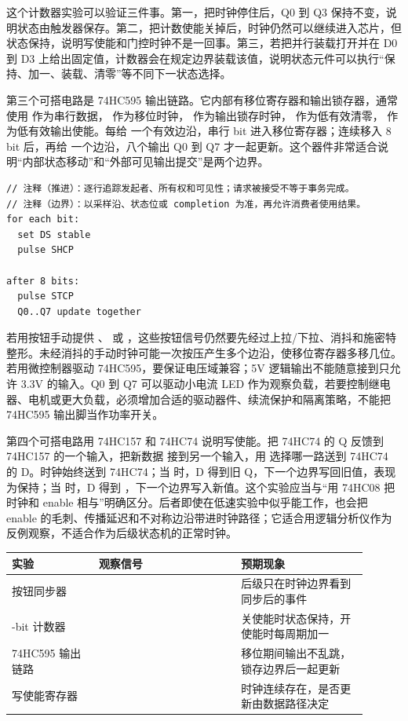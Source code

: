 这个计数器实验可以验证三件事。第一，把时钟停住后，Q0 到 Q3 保持不变，说明状态由触发器保存。第二，把计数使能关掉后，时钟仍然可以继续进入芯片，但状态保持，说明写使能和门控时钟不是一回事。第三，若把并行装载打开并在 D0 到 D3 上给出固定值，计数器会在规定边界装载该值，说明状态元件可以执行“保持、加一、装载、清零”等不同下一状态选择。

第三个可搭电路是 74HC595 输出链路。它内部有移位寄存器和输出锁存器，通常使用  作为串行数据， 作为移位时钟， 作为输出锁存时钟， 作为低有效清零， 作为低有效输出使能。每给  一个有效边沿，串行 bit 进入移位寄存器；连续移入 8 bit 后，再给  一个边沿，八个输出 Q0 到 Q7 才一起更新。这个器件非常适合说明“内部状态移动”和“外部可见输出提交”是两个边界。

\begin{lstlisting}
// 注释（推进）：逐行追踪发起者、所有权和可见性；请求被接受不等于事务完成。
// 注释（边界）：以采样沿、状态位或 completion 为准，再允许消费者使用结果。
for each bit:
  set DS stable
  pulse SHCP

after 8 bits:
  pulse STCP
  Q0..Q7 update together
\end{lstlisting}

若用按钮手动提供 、 或 ，这些按钮信号仍然要先经过上拉/下拉、消抖和施密特整形。未经消抖的手动时钟可能一次按压产生多个边沿，使移位寄存器多移几位。若用微控制器驱动 74HC595，要保证电压域兼容；5V 逻辑输出不能随意接到只允许 3.3V 的输入。Q0 到 Q7 可以驱动小电流 LED 作为观察负载，若要控制继电器、电机或更大负载，必须增加合适的驱动器件、续流保护和隔离策略，不能把 74HC595 输出脚当作功率开关。

第四个可搭电路用 74HC157 和 74HC74 说明写使能。把 74HC74 的 Q 反馈到 74HC157 的一个输入，把新数据  接到另一个输入，用  选择哪一路送到 74HC74 的 D。时钟始终送到 74HC74；当  时，D 得到旧 Q，下一个边界写回旧值，表现为保持；当  时，D 得到 ，下一个边界写入新值。这个实验应当与“用 74HC08 把时钟和 enable 相与”明确区分。后者即使在低速实验中似乎能工作，也会把 enable 的毛刺、传播延迟和不对称边沿带进时钟路径；它适合用逻辑分析仪作为反例观察，不适合作为后级状态机的正常时钟。

\begin{longtable}{L{0.22\linewidth}L{0.36\linewidth}L{0.32\linewidth}}
\toprule
实验 & 观察信号 & 预期现象 \\
\midrule
按钮同步器 &  & 后级只在时钟边界看到同步后的事件 \\-bit 计数器 &  & 关使能时状态保持，开使能时每周期加一 \\\tablerowrule
74HC595 输出链路 &  & 移位期间输出不乱跳，锁存边界后一起更新 \\\tablerowrule
写使能寄存器 &  & 时钟连续存在，是否更新由数据路径决定 \\
\bottomrule
\end{longtable}

